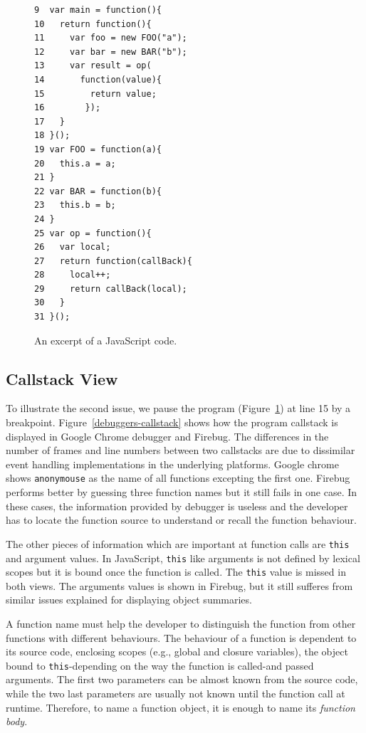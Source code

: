 \documentclass[10pt, preprint]{sigplanconf}
\begin{document}
\begin{figure}[htp]
{\small 
\begin{verbatim}
9  var main = function(){
10   return function(){
11     var foo = new FOO("a");
12     var bar = new BAR("b");
13     var result = op(
14       function(value){
15         return value;
16        });
17   }
18 }();
19 var FOO = function(a){
20   this.a = a;
21 }
22 var BAR = function(b){
23   this.b = b;
24 }
25 var op = function(){
26   var local;
27   return function(callBack){
28     local++;
29     return callBack(local);
30   }
31 }();
\end{verbatim}}
\caption{An excerpt of a JavaScript code.}
\label{js-code}
\end{figure}

\subsection{Callstack View}
To illustrate the second issue, we pause the program (Figure~\ref{js-code}) at line 15 by a breakpoint. Figure~\ref{debuggers-callstack} shows how the program callstack is displayed in Google Chrome debugger and Firebug. The differences in the number of frames and line numbers between two callstacks are due to dissimilar event handling implementations in the underlying platforms. Google chrome shows {\small\texttt{anonymouse}} as the name of all functions excepting the first one. Firebug performs better by guessing three function names but it still fails in one case. In these cases, the information provided by debugger is useless and the developer has to locate the function source to understand or recall the function behaviour. 

The other pieces of information which are important at function calls are {\small\texttt{this}} and argument values. In JavaScript, {\small\texttt{this}} like arguments is not defined by lexical scopes but it is bound once the function is called. The {\small\texttt{this}} value is missed in both views. The arguments values is shown in Firebug, but it still sufferes from similar issues explained for displaying object summaries.

A function name must help the developer to
distinguish the function from other functions with different behaviours. The behaviour of a function is dependent to its source code, enclosing scopes (e.g., global and closure variables), the object bound to {\small\texttt{this}}-depending on the way the function is called-and passed arguments. The first two parameters can be almost known from the source code, while the two last parameters are usually not known until the function call at runtime. Therefore, to name a function object, it is enough to name its \textit{function body}. 
\end{document}
